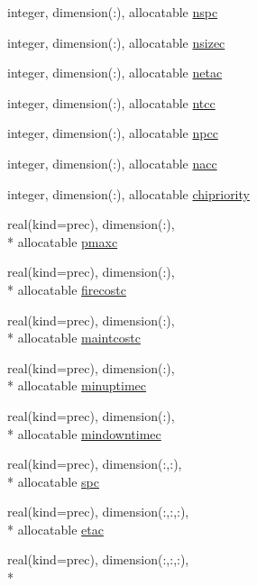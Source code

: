 \begin{DoxyCompactItemize}
\item 
integer, dimension(\-:), allocatable \hyperlink{classinputvar_aad6ce13b0378ba79e193cb3738e2d938}{nspc}
\item 
integer, dimension(\-:), allocatable \hyperlink{classinputvar_af28da5ec88564638bee476f2a37f5308}{nsizec}
\item 
integer, dimension(\-:), allocatable \hyperlink{classinputvar_ad9998f4f97f100bf6294fb8fa083bfe7}{netac}
\item 
integer, dimension(\-:), allocatable \hyperlink{classinputvar_aaf3cc67ce289abacf61f20f5fdcfc3f6}{ntcc}
\item 
integer, dimension(\-:), allocatable \hyperlink{classinputvar_a78f4d80d45d564c96dd9101258656f66}{npcc}
\item 
integer, dimension(\-:), allocatable \hyperlink{classinputvar_a8e4bb497a3825e6f554e3268dd2bbd63}{nacc}
\item 
integer, dimension(\-:), allocatable \hyperlink{classinputvar_a2cb9252c074d0ed99a8ec738dfc04ee2}{chipriority}
\item 
real(kind=prec), dimension(\-:), \\*
allocatable \hyperlink{classinputvar_a93b555571bee30038d48c86de7ab5c14}{pmaxc}
\item 
real(kind=prec), dimension(\-:), \\*
allocatable \hyperlink{classinputvar_afa2d0c05087f3cda5d3e984037a2a354}{firecostc}
\item 
real(kind=prec), dimension(\-:), \\*
allocatable \hyperlink{classinputvar_a4371de15edf20ae9883b07b3b843655d}{maintcostc}
\item 
real(kind=prec), dimension(\-:), \\*
allocatable \hyperlink{classinputvar_a1c2a4cc32567b94cb7a884d3731bb5f4}{minuptimec}
\item 
real(kind=prec), dimension(\-:), \\*
allocatable \hyperlink{classinputvar_a9bb1424e04e5c89d561d2316045f98d4}{mindowntimec}
\item 
real(kind=prec), dimension(\-:,\-:), \\*
allocatable \hyperlink{classinputvar_a7a6b03a57941065017f0fe71a9d641f1}{spc}
\item 
real(kind=prec), dimension(\-:,\-:,\-:), \\*
allocatable \hyperlink{classinputvar_a3c6d7517ec3f9097a8d4264b50e61b48}{etac}
\item 
real(kind=prec), dimension(\-:,\-:,\-:), \\*

\end{DoxyCompactItemize}
